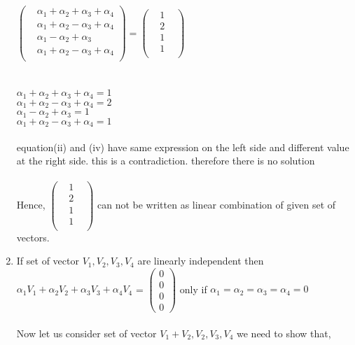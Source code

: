 \documentclass[45pt]{article}
\begin{document}
\begin{enumerate}
$ \begin{pmatrix}
    &\alpha_1+\alpha_2+\alpha_3 +\alpha_4\\
    &\alpha_1+\alpha_2-\alpha_3 +\alpha_4\\
    &\alpha_1-\alpha_2+\alpha_3\\
    &\alpha_1+\alpha_2-\alpha_3 +\alpha_4\\
  \end{pmatrix} =\begin{pmatrix}
    &1&\\&2&\\ &1&\\&1&\\
  \end{pmatrix}$\\\\\\
      $\alpha_1+\alpha_2+\alpha_3 +\alpha_4 =1$\\
      $\alpha_1+\alpha_2-\alpha_3 +\alpha_4=2$\\
      $\alpha_1-\alpha_2+\alpha_3=1$\\
      $\alpha_1+\alpha_2-\alpha_3 +\alpha_4=1$\\\\
   equation(ii) and (iv) have same expression on the left side and different value at the right side. this is a contradiction. therefore  there is no solution\\\\
Hence, $\begin{pmatrix}
  &1&\\&2&\\ &1&\\&1&\\
\end{pmatrix}$ can not be written as linear combination of given set of vectors.

\item If set of vector {$V_1,V_2,V_3,V_4$} are linearly independent then \\
 $\alpha_1 V_1+\alpha_2 V_2+\alpha_3 V_3+ \alpha_4 V_4$ =
$\begin{pmatrix}
0\\0\\0\\0
\end{pmatrix}
$ only if $\alpha_1 = \alpha_2 =\alpha_3= \alpha_4=0$\\\\
Now let us consider set of vector ${V_1+V_2,V_2,V_3,V_4}$
we need to show that,\\


\end{enumerate}
\end{document}
